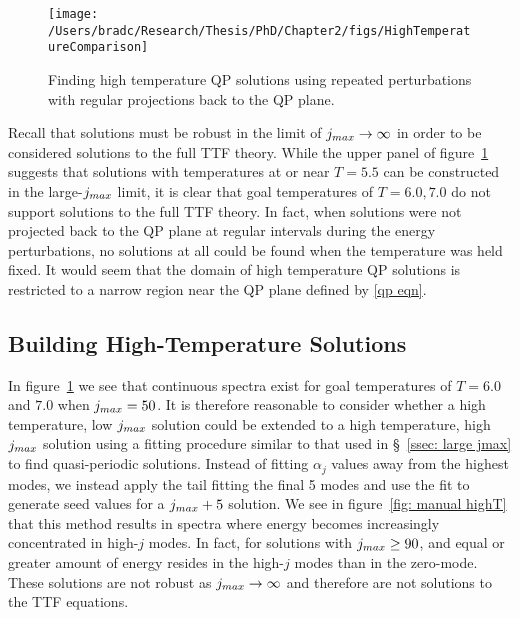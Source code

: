 \documentclass[../PhD.tex]{subfiles}
\begin{document}
\begin{figure}[tp!]
	\centering
		\texttt{[image: /Users/bradc/Research/Thesis/PhD/Chapter2/figs/HighTemperatureComparison]}
		\caption{Finding high temperature QP solutions using repeated perturbations with regular projections back to the QP plane.}
		\label{fig: const T perturbs}
\end{figure}

Recall that solutions must be robust in the limit of $j_{max} \to \infty$ in order to be considered solutions to the full TTF theory. While the upper panel of figure~\ref{fig: const T perturbs} suggests that solutions with temperatures at or near $T=5.5$ can be constructed in the large-$j_{max}$ limit, it is clear that goal temperatures of $T=6.0, 7.0$ do not support solutions to the full TTF theory. In fact, when solutions were not projected back to the QP plane at regular intervals during the energy perturbations, no solutions at all could be found when the temperature was held fixed. It would seem that the domain of high temperature QP solutions is restricted to a narrow region near the QP plane defined by \eqref{qp eqn}. 

\newpage 


\subsection{Building High-Temperature Solutions}
\label{ssec: by hand highT}

In figure~\ref{fig: const T perturbs} we see that continuous spectra exist for goal temperatures of $T=6.0$ and $7.0$ when $j_{max} = 50$. It is therefore reasonable to consider whether a high temperature, low $j_{max}$ solution could be extended to a high temperature, high $j_{max}$ solution using a fitting procedure similar to that used in \S~\!\ref{ssec: large jmax} to find quasi-periodic solutions. Instead of fitting $\alpha_j$ values away from the highest modes, we instead apply the tail fitting the final 5 modes and use the fit to generate seed values for a $j_{max} + 5$ solution. We see in figure~\ref{fig: manual highT} that this method results in spectra where energy becomes increasingly concentrated in high-$j$ modes. In fact, for solutions with $j_{max} \geq 90$, and equal or greater amount of energy resides in the high-$j$ modes than in the zero-mode. These solutions are not robust as $j_{max} \to \infty$ and therefore are not solutions to the TTF equations.
\end{document}
